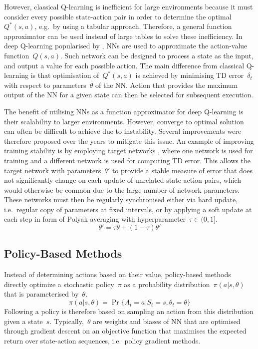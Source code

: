However, classical Q-learning is inefficient for large environments because it must consider every possible state-action pair in order to determine the optimal~\(Q^{*}(s, a)\), e.g.~by using a tabular approach. Therefore, a general function approximator can be used instead of large tables to solve these inefficiency. In deep Q-learning popularised by \citet{mnih_human-level_2015}, NNs are used to approximate the action-value function~\(Q(s, a)\). Such network can be designed to process a state as the input, and output a value for each possible action. The main difference from classical Q-learning is that optimisation of~\(Q^{*}(s, a)\) is achieved by minimising TD error~\(\delta_{t}\) with respect to parameters~\(\theta\) of the NN. Action that provides the maximum output of the NN for a given state can then be selected for subsequent execution.

The benefit of utilising NNs as a function approximator for deep Q-learning is their scalability to larger environments. However, converge to optimal solution can often be difficult to achieve due to instability. Several improvements were therefore proposed over the years to mitigate this issue. An example of improving training stability is by employing target networks \cite{mnih_human-level_2015}, where one network is used for training and a different network is used for computing TD error. This allows the target network with parameters~\(\theta'\) to provide a stable measure of error that does not significantly change on each update of unrelated state-action pairs, which would otherwise be common due to the large number of network parameters. These networks must then be regularly synchronised either via hard update, i.e.~regular copy of parameters at fixed intervals, or by applying a soft update at each step in form of Polyak averaging with hyperparameter~\(\tau \in (0, 1]\).
\begin{equation}
    \theta' = \tau \theta + (1-\tau) \theta'
\end{equation}


\subsection{Policy-Based Methods}

Instead of determining actions based on their value, policy-based methods directly optimize a stochastic policy~\(\pi\) as a probability distribution~\(\pi(a \vert s, \theta)\) that is parameterised by~\(\theta\).
\begin{equation}
    \pi(a \vert s, \theta) = \Pr\{A_{t}{=}a \vert S_{t}{=}s, \theta_{t}{=}\theta \}
\end{equation}
Following a policy is therefore based on sampling an action from this distribution given a state~\(s\). Typically,~\(\theta\) are weights and biases of NN that are optimised through gradient descent on an objective function that maximises the expected return over state-action sequences, i.e.~policy gradient methods.

